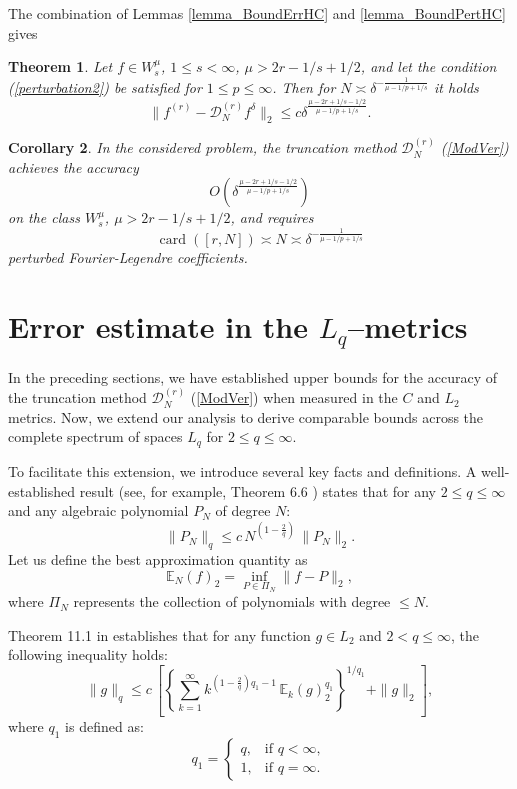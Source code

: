 \documentclass[10pt]{extarticle}
\DeclareMathOperator{\card}{card}
\newtheorem{theorem}{Theorem}[section]
\newtheorem{corollary}[theorem]{Corollary}
\begin{document}
The combination of Lemmas \ref{lemma_BoundErrHC} and \ref{lemma_BoundPertHC} gives

\begin{theorem} \label{Th1}
Let $f\in W^\mu_{s}$, $1\leq s< \infty$, $\mu>2r-1/s+1/2$, and let the condition (\ref{perturbation2}) be satisfied for $1\le p\le \infty$. Then for $N\asymp \delta^{-\frac{1}{\mu-1/p+1/s}}$ it holds
	$$
	\|f^{(r)} - \mathcal{D}^{(r)}_N f^\delta\|_2 \leq c \delta^{\frac{\mu-2r+1/s-1/2}{\mu-1/p+1/s}}.
	$$
\end{theorem}

\begin{corollary} \label{Cor1}
In the considered problem, the truncation method $\mathcal{D}^{(r)}_{N}$ (\ref{ModVer})
achieves the accuracy
	$$
	O\left(\delta^{\frac{\mu-2r+1/s-1/2}{\mu-1/p+1/s}}\right)
	$$
	on the class $W^{\mu}_{s}$, $\mu>2r-1/s+1/2$, and requires
	$$
	\card([r,N]) \asymp N \asymp \delta^{-\frac{1}{\mu-1/p+1/s}}
	$$
perturbed Fourier-Legendre coefficients.
\end{corollary}

\section{Error estimate in the $L_{q}$--metrics}  \label{L_q}

In the preceding sections, we have established upper bounds for the accuracy of the truncation method $\mathcal{D}^{(r)}_{N}$ (\ref{ModVer}) when measured in the $C$ and $L_{2}$ metrics. Now, we extend our analysis to derive comparable bounds across the complete spectrum of spaces $L_{q}$ for $2\le q\le \infty$.

To facilitate this extension, we introduce several key facts and definitions. A well-established result
(see, for example, Theorem 6.6 \cite{DT}) states that for any $2 \le q \le \infty$ and any algebraic polynomial $P_N$ of degree $N$:
\begin{equation}  \label{P_N}
\|P_N\|_{q} \le c\, N^{(1-\frac{2}{q})}\, \|P_N\|_{2} .
\end{equation}
Let us define the best approximation quantity as
$$
\mathbb{E}_N (f)_{2} = \inf\limits_{P\in\Pi_N} \|f - P\|_{2} ,
$$
where $\Pi_N$ represents the collection of polynomials with degree $\le N$.

Theorem 11.1 in \cite{DT} establishes that for any function $g\in L_{2}$ and $2 < q \le \infty$, the following inequality holds:
\begin{equation}  \label{g}
\|g\|_{q} \le c\,
\left[ \left\{\sum_{k=1}^\infty  k^{(1-\frac{2}{q}) q_1-1}\,\mathbb{E}_k(g)_{2}^{q_1} \right\}^{1/q_1} +
\|g\|_{2} \right] ,
\end{equation}
where $q_1$ is defined as:
$$
q_1 = \begin{cases}
q, & \text{if } q<\infty , \\
1, & \text{if } q=\infty .
\end{cases}
$$
\end{document}

